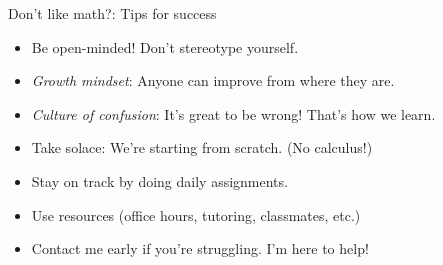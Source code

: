 \documentclass[10pt]{beamer}
\begin{document}
\begin{frame}{Don't like math?:  Tips for success}

\begin{itemize}
	\item Be open-minded!  Don't stereotype yourself. \pause  %
	\item \textit{Growth mindset}: Anyone can improve from where they are.   \pause
	\item \textit{Culture of confusion}: It's great to be wrong! That's how we learn.  \pause 
	\item Take solace: We're starting from scratch. (No calculus!) \pause
	\item Stay on track by doing daily assignments. \pause 
	\item Use resources (office hours, tutoring, classmates, etc.) \pause 
	\item Contact me early if you're struggling.  I'm here to help! \pause 
\end{itemize}

\end{frame}




%
%	
\end{document}
